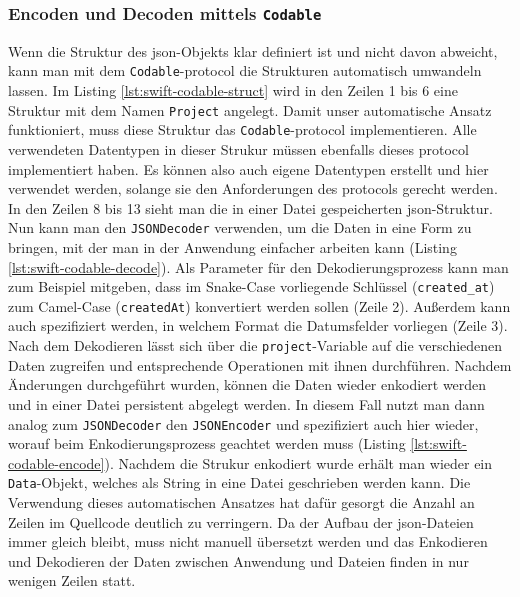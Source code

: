 \subsubsection{Encoden und Decoden mittels \texttt{Codable}}
Wenn die Struktur des \ac{json}-Objekts klar definiert ist und nicht davon abweicht, kann man mit dem \texttt{Codable}-\Gls{protocol} die Strukturen automatisch umwandeln lassen.
Im Listing \ref{lst:swift-codable-struct} wird in den Zeilen 1 bis 6 eine Struktur mit dem Namen \texttt{Project} angelegt.
Damit unser automatische Ansatz funktioniert, muss diese Struktur das \texttt{Codable}-\Gls{protocol} implementieren.
Alle verwendeten Datentypen in dieser Strukur müssen ebenfalls dieses \Gls{protocol} implementiert haben.
Es können also auch eigene Datentypen erstellt und hier verwendet werden, solange sie den Anforderungen des \Glspl{protocol} gerecht werden.
In den Zeilen 8 bis 13 sieht man die in einer Datei gespeicherten \ac{json}-Struktur.
Nun kann man den \texttt{JSONDecoder} verwenden, um die Daten in eine Form zu bringen, mit der man in der Anwendung einfacher arbeiten kann (Listing \ref{lst:swift-codable-decode}).
Als Parameter für den Dekodierungsprozess kann man zum Beispiel mitgeben, dass im Snake-Case vorliegende Schlüssel (\texttt{created\_at}) zum Camel-Case (\texttt{createdAt}) konvertiert werden sollen (Zeile 2).
Außerdem kann auch spezifiziert werden, in welchem Format die Datumsfelder vorliegen (Zeile 3).
Nach dem Dekodieren lässt sich über die \texttt{project}-Variable auf die verschiedenen Daten zugreifen und entsprechende Operationen mit ihnen durchführen.
Nachdem Änderungen durchgeführt wurden, können die Daten wieder enkodiert werden und in einer Datei persistent abgelegt werden.
In diesem Fall nutzt man dann analog zum \texttt{JSONDecoder} den \texttt{JSONEncoder} und spezifiziert auch hier wieder, worauf beim Enkodierungsprozess geachtet werden muss (Listing \ref{lst:swift-codable-encode}).
Nachdem die Strukur enkodiert wurde erhält man wieder ein \texttt{Data}-Objekt, welches als String in eine Datei geschrieben werden kann.\pbreak%
%
Die Verwendung dieses automatischen Ansatzes hat dafür gesorgt die Anzahl an Zeilen im Quellcode deutlich zu verringern.
Da der Aufbau der \ac{json}-Dateien immer gleich bleibt, muss nicht manuell übersetzt werden und das Enkodieren und Dekodieren der Daten zwischen Anwendung und Dateien finden in nur wenigen Zeilen statt.

